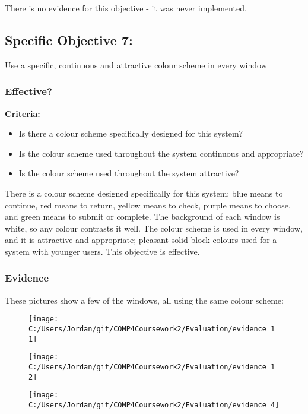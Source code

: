 There is no evidence for this objective - it was never implemented.

\subsection{Specific Objective 7: }

Use a specific, continuous and attractive colour scheme in every window

\subsubsection{Effective?}

\textbf{Criteria: }

\begin{itemize}
	\item Is there a colour scheme specifically designed for this system?
	\item Is the colour scheme used throughout the system continuous and appropriate?
	\item Is the colour scheme used throughout the system attractive?
\end{itemize}

There is a colour scheme designed specifically for this system; blue means to continue, red means to return, yellow means to check, purple means to choose, and green means to submit or complete. The background of each window is white, so any colour contrasts it well. The colour scheme is used in every window, and it is attractive and appropriate; pleasant solid block colours used for a system with younger users. This objective is effective.

\subsubsection{Evidence}

These pictures show a few of the windows, all using the same colour scheme:

\begin{figure}[H]
	\texttt{[image: C:/Users/Jordan/git/COMP4Coursework2/Evaluation/evidence\_1\_1]}
\end{figure}

\begin{figure}[H]
	\texttt{[image: C:/Users/Jordan/git/COMP4Coursework2/Evaluation/evidence\_1\_2]}
\end{figure}

\begin{figure}[H]
	\texttt{[image: C:/Users/Jordan/git/COMP4Coursework2/Evaluation/evidence\_4]}
\end{figure}

